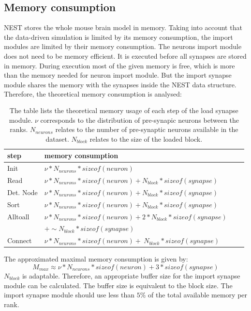 \subsection{Memory consumption}
NEST stores the whole mouse brain model in memory.
Taking into account that the data-driven simulation is limited by its memory consumption, the import modules are limited by their memory consumption.
The neurons import module does not need to be memory efficient.
It is executed before all synapses are stored in memory.
During execution most of the given memory is free, which is more than the memory needed for neuron import module.
But the import synapse module shares the memory with the synapses inside the NEST data structure. 
Therefore, the theoretical memory consumption is analysed:
\begin{table}[ht!]
\begin{tabular}{| l | l | l | l |}
    \hline
    step & memory consumption \\ \hline \hline
    Init & $\nu * N_{neurons} * sizeof(neuron)$ \\ \hline
    Read & $\nu * N_{neurons} * sizeof(neuron) + N_{block} * sizeof(synapse)$ \\ \hline
    Det. Node & $\nu * N_{neurons} * sizeof(neuron) + N_{block} * sizeof(synapse)$ \\ \hline
    Sort & $\nu * N_{neurons} * sizeof(neuron) + N_{block} * sizeof(synapse)$ \\ \hline
    Alltoall & $\nu * N_{neurons} * sizeof(neuron) + 2 * N_{block} * sizeof(synapse)$ \\
    &$ + \sim N_{block} * sizeof(synapse)$ \\ \hline
    Connect & $\nu * N_{neurons} * sizeof(neuron) +  ~N_{block} * sizeof(synapse) $ \\ \hline 
    \end{tabular}
\caption{The table lists the theoretical memory usage of each step of the load synapse module.
$\nu$ corresponds to the distribution of pre-synapic neurons between the ranks.
$N_{neurons}$ relates to the number of pre-synaptic neurons available in the dataset.
$N_{block}$ relates to the size of the loaded block.}
\end{table}
The approximated maximal memory consumption is given by:
\begin{equation}
 M_{max} \approx \nu * N_{neurons} * sizeof(neuron) + 3 * sizeof(synapse)
\end{equation}
$N_{block}$ is adaptable.
Therefore, an appropriate buffer size for the import synapse module can be calculated.
The buffer size is equivalent to the block size.
The import synapse module should use less than $5\%$ of the total available memory per rank.

